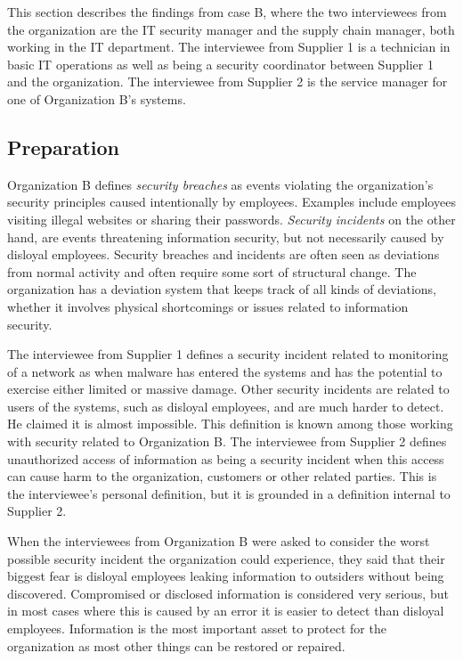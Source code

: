 This section describes the findings from case B, where the two interviewees from the organization are the IT security manager and the supply chain manager, both working in the IT department. The interviewee from Supplier 1 is a technician in basic IT operations as well as being a security coordinator between Supplier 1 and the organization. The interviewee from Supplier 2 is the service manager for one of Organization B's systems.

\subsection{Preparation}
Organization B defines \textit{security breaches} as events violating the organization's security principles caused intentionally by employees. Examples include employees visiting illegal websites or sharing their passwords. \textit{Security incidents} on the other hand, are events threatening information security, but not necessarily caused by disloyal employees. Security breaches and incidents are often seen as deviations from normal activity and often require some sort of structural change. The organization has a deviation system that keeps track of all kinds of deviations, whether it involves physical shortcomings or issues related to information security.

The interviewee from Supplier 1 defines a security incident related to monitoring of a network as when malware has entered the systems and has the potential to exercise either limited or massive damage. Other security incidents are related to users of the systems, such as disloyal employees, and are much harder to detect. He claimed it is almost impossible. This definition is known among those working with security related to Organization B. The interviewee from Supplier 2 defines unauthorized access of information as being a security incident when this access can cause harm to the organization, customers or other related parties. This is the interviewee's personal definition, but it is grounded in a definition internal to Supplier 2.

When the interviewees from Organization B were asked to consider the worst possible security incident the organization could experience, they said that their biggest fear is disloyal employees leaking information to outsiders without being discovered. Compromised or disclosed information is considered very serious, but in most cases where this is caused by an error it is easier to detect than disloyal employees. Information is the most important asset to protect for the organization as most other things can be restored or repaired.

